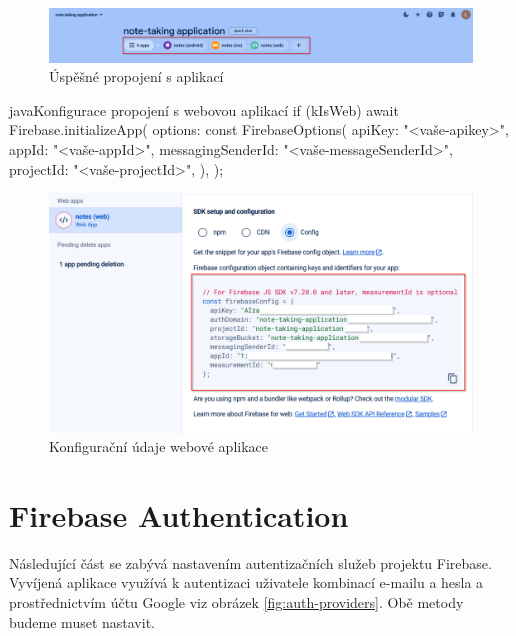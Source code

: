 \documentclass[czech, bc, kiv, he, iso690numb]{fasthesis}
\begin{document}
\begin{figure}[h!]
  \centering
  \includegraphics[width=1\textwidth]{img/BP-Runt/firebase-configuration/firebase-connection.png}
  \caption{Úspěšné propojení s aplikací}
  \label{fig:firebase-connection}
\end{figure}

\begin{code}{java}{Konfigurace propojení s webovou aplikací \label{code:web-configuration}}
if (kIsWeb) {
      await Firebase.initializeApp(
        options: const FirebaseOptions(
          apiKey: "<vaše-apikey>",
          appId: "<vaše-appId>",
          messagingSenderId: "<vaše-messageSenderId>",
          projectId: "<vaše-projectId>",
        ),
      );
    }
\end{code}

\begin{figure}[h!]
  \centering
  \includegraphics[width=1\textwidth]{img/BP-Runt/firebase-configuration/configuration-data-web.png}
  \caption{Konfigurační údaje webové aplikace}
  \label{fig:firebase-web-configuration}
\end{figure}

\section{Firebase Authentication}

Následující část se zabývá nastavením autentizačních služeb projektu Firebase. Vyvíjená aplikace využívá k autentizaci uživatele kombinací e-mailu a hesla a prostřednictvím účtu Google viz obrázek \ref{fig:auth-providers}. Obě metody budeme muset nastavit.
\end{document}
